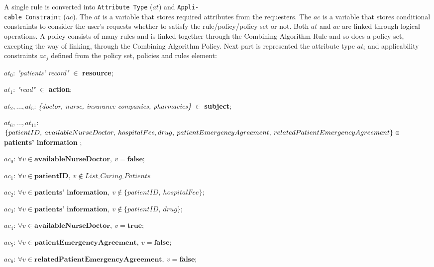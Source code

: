 
A single rule is converted into \texttt{Attribute Type} ($at$) and \texttt{Appli-\\cable Constraint} ($ac$). 
The $at$ is a variable that stores required attributes from the requesters.
The $ac$ is a variable that stores conditional constraints to consider the user's requests whether to satisfy the rule/policy/policy set or not.
Both $at$ and $ac$ are linked through logical operations. 
A policy consists of many rules and is linked together through the Combining Algorithm Rule and so does a policy set, excepting the way of linking, through the Combining Algorithm Policy.
Next part is represented the attribute type $at_i$ and applicability constraints $ac_j$ defined from the policy set, policies and rules element:

\textit{$at_0$}: \textit{"patients' record"} $ \in $ \textbf{resource};%

\textit{$at_1$}: \textit{"read"} $ \in $ \textbf{action};

\textit{$at_2, \dots, at_5$}: \textit{\{doctor, nurse, insurance companies, pharmacies\}} $ \in $ \textbf{subject};

\textit{$at_6, \dots, at_{11}$}: $\{patientID,\: availableNurseDoctor,\: hospitalFee,\\ drug,\: patientEmergencyAgreement,\: relatedPatientEmergencyA\\greement\} \in $ \textbf{patients' \:information} ;

\textit{$ac_0$}: $ \forall \textit{v} \in \textbf{availableNurseDoctor}, \: \textit{v} = \textbf{false}$;

\textit{$ac_1$}: $ \forall \textit{v} \in \textbf{patientID}, \: \textit{v}  \notin List\_Caring\_Patients$

\textit{$ac_2$}: $ \forall \textit{v} \in \textbf{patients' information}, \: \textit{v} \notin \{patientID,\:hospitalFee\} $;

\textit{$ac_3$}: $ \forall \textit{v} \in \textbf{patients' information}, \: \textit{v} \notin \{patientID,\:drug\} $;

\textit{$ac_4$}: $ \forall \textit{v} \in \textbf{availableNurseDoctor}, \: \textit{v} = \textbf{true}$;

\textit{$ac_5$}: $ \forall \textit{v} \in \textbf{patientEmergencyAgreement}, \: \textit{v} = \textbf{false}$;

\textit{$ac_6$}: $ \forall \textit{v} \in \textbf{relatedPatientEmergencyAgreement}, \: \textit{v} = \textbf{false}$;

